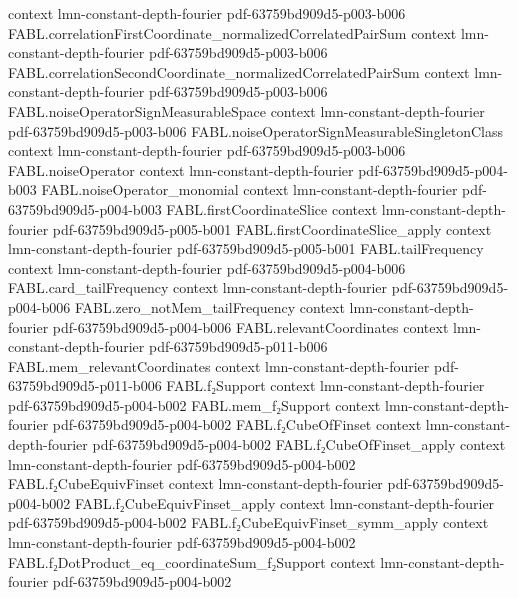 \begin{theorem}
  {context}
  {lmn-constant-depth-fourier}
  {pdf-63759bd909d5-p003-b006}
\proofstep
  {FABL.correlationFirstCoordinate_normalizedCorrelatedPairSum}
  {context}
  {lmn-constant-depth-fourier}
  {pdf-63759bd909d5-p003-b006}
\proofstep
  {FABL.correlationSecondCoordinate_normalizedCorrelatedPairSum}
  {context}
  {lmn-constant-depth-fourier}
  {pdf-63759bd909d5-p003-b006}
\proofstep
  {FABL.noiseOperatorSignMeasurableSpace}
  {context}
  {lmn-constant-depth-fourier}
  {pdf-63759bd909d5-p003-b006}
\proofstep
  {FABL.noiseOperatorSignMeasurableSingletonClass}
  {context}
  {lmn-constant-depth-fourier}
  {pdf-63759bd909d5-p003-b006}
\proofstep
  {FABL.noiseOperator}
  {context}
  {lmn-constant-depth-fourier}
  {pdf-63759bd909d5-p004-b003}
\proofstep
  {FABL.noiseOperator_monomial}
  {context}
  {lmn-constant-depth-fourier}
  {pdf-63759bd909d5-p004-b003}
\proofstep
  {FABL.firstCoordinateSlice}
  {context}
  {lmn-constant-depth-fourier}
  {pdf-63759bd909d5-p005-b001}
\proofstep
  {FABL.firstCoordinateSlice_apply}
  {context}
  {lmn-constant-depth-fourier}
  {pdf-63759bd909d5-p005-b001}
\proofstep
  {FABL.tailFrequency}
  {context}
  {lmn-constant-depth-fourier}
  {pdf-63759bd909d5-p004-b006}
\proofstep
  {FABL.card_tailFrequency}
  {context}
  {lmn-constant-depth-fourier}
  {pdf-63759bd909d5-p004-b006}
\proofstep
  {FABL.zero_notMem_tailFrequency}
  {context}
  {lmn-constant-depth-fourier}
  {pdf-63759bd909d5-p004-b006}
\proofstep
  {FABL.relevantCoordinates}
  {context}
  {lmn-constant-depth-fourier}
  {pdf-63759bd909d5-p011-b006}
\proofstep
  {FABL.mem_relevantCoordinates}
  {context}
  {lmn-constant-depth-fourier}
  {pdf-63759bd909d5-p011-b006}
\proofstep
  {FABL.f₂Support}
  {context}
  {lmn-constant-depth-fourier}
  {pdf-63759bd909d5-p004-b002}
\proofstep
  {FABL.mem_f₂Support}
  {context}
  {lmn-constant-depth-fourier}
  {pdf-63759bd909d5-p004-b002}
\proofstep
  {FABL.f₂CubeOfFinset}
  {context}
  {lmn-constant-depth-fourier}
  {pdf-63759bd909d5-p004-b002}
\proofstep
  {FABL.f₂CubeOfFinset_apply}
  {context}
  {lmn-constant-depth-fourier}
  {pdf-63759bd909d5-p004-b002}
\proofstep
  {FABL.f₂CubeEquivFinset}
  {context}
  {lmn-constant-depth-fourier}
  {pdf-63759bd909d5-p004-b002}
\proofstep
  {FABL.f₂CubeEquivFinset_apply}
  {context}
  {lmn-constant-depth-fourier}
  {pdf-63759bd909d5-p004-b002}
\proofstep
  {FABL.f₂CubeEquivFinset_symm_apply}
  {context}
  {lmn-constant-depth-fourier}
  {pdf-63759bd909d5-p004-b002}
\proofstep
  {FABL.f₂DotProduct_eq_coordinateSum_f₂Support}
  {context}
  {lmn-constant-depth-fourier}
  {pdf-63759bd909d5-p004-b002}
\proofstep

\end{theorem}

